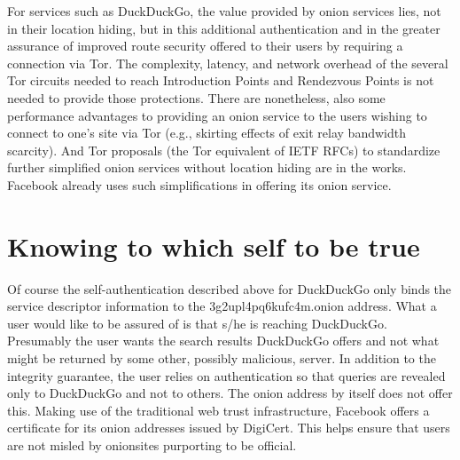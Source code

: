 \documentclass[10pt, conference, compsocconf]{styles/IEEEtran}
\begin{document}
For services such as DuckDuckGo, the value provided by onion services
lies, not in their location hiding, but in this additional
authentication and in the greater assurance of improved route security
offered to their users by requiring a connection via Tor. The
complexity, latency, and network overhead of the several Tor circuits
needed to reach Introduction Points and Rendezvous Points is not
needed to provide those protections. There are nonetheless, also some
performance advantages to providing an onion service to the users
wishing to connect to one's site via Tor (e.g., skirting effects of
exit relay bandwidth scarcity). And Tor proposals (the Tor equivalent
of IETF RFCs) to standardize further simplified onion services without
location hiding are in the works. Facebook already uses such
simplifications in offering its onion service.


\section{Knowing to which self to be true}

Of course the self-authentication described above 
for DuckDuckGo only binds the
service descriptor information to the 3g2upl4pq6kufc4m.onion
address. What a user would like to be assured of is that s/he is
reaching DuckDuckGo. Presumably the user wants the search results
DuckDuckGo offers and not what might be returned by some other,
possibly malicious, server.  In addition to the integrity guarantee,
the user relies on authentication so that queries are revealed only to
DuckDuckGo and not to others. The onion address by itself does not
offer this. Making use of the traditional web trust infrastructure,
Facebook offers a certificate for its onion addresses
issued by DigiCert.  This helps ensure that users are not misled by
onionsites purporting to be official.
\end{document}

